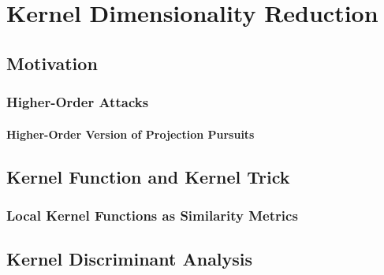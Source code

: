 
\chapter{Kernel Dimensionality Reduction} %

\label{ChapterKernel}


\section{Motivation}
\subsection{Higher-Order Attacks}
\subsubsection{Higher-Order Version of Projection Pursuits}


\section{Kernel Function and Kernel Trick}
\subsection{Local Kernel Functions as Similarity Metrics}
\section{Kernel Discriminant Analysis}

